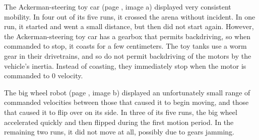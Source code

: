 The Ackerman-steering toy car (page \pageref{img_traj}, image a) displayed very consistent mobility. In four out of its five runs, it crossed the arena without incident. 
In one run, it started and went a small distance, but then did not start again. 
However, the Ackerman-steering toy car has a gearbox that permits backdriving, so when commanded to stop, it coasts for a few centimeters. 
The toy tanks use a worm gear in their drivetrains, and so do not permit backdriving of the motors by the vehicle's inertia. 
Instead of coasting, they immediately stop when the motor is commanded to 0 velocity. 

The big wheel robot (page \pageref{img_traj}, image b) displayed an unfortunately small range of commanded velocities between those that caused it to begin moving, and those that caused it to flip over on its side.
In three of its five runs, the big wheel accelerated quickly and then flipped during the first motion period. 
In the remaining two runs, it did not move at all, possibly due to gears jamming. 

